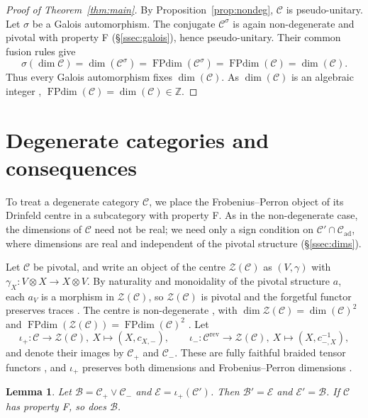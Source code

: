 \documentclass[11pt,oneside]{amsart}
\newtheorem{lemma}[theorem]{Lemma}
\theoremstyle{remark}
\newcommand{\C}{\mathcal C}
\newcommand{\B}{\mathcal B}
\newcommand{\E}{\mathcal E}
\newcommand{\Zc}{\mathcal Z}
\newcommand{\FP}{\operatorname{FPdim}}
\newcommand{\Z}{\mathbb Z}
\newcommand{\ad}{\mathrm{ad}}
\newcommand{\rev}{\mathrm{rev}}
\begin{document}
\begin{proof}[Proof of Theorem~\ref{thm:main}]
By Proposition~\ref{prop:nondeg}, $\C$ is pseudo-unitary. Let $\sigma$ be a
Galois automorphism. The conjugate $\C^\sigma$ is again non-degenerate and
pivotal with property F (\S\ref{ssec:galois}), hence pseudo-unitary. Their
common fusion rules give
\[
\sigma(\dim\C)=\dim(\C^\sigma)=\FP(\C^\sigma)=\FP(\C)=\dim(\C).
\]
Thus every Galois automorphism fixes $\dim(\C)$. As $\dim(\C)$ is an algebraic
integer \cite[Theorem~2.3, Remark~2.5]{ENO}, $\FP(\C)=\dim(\C)\in\Z$.
\end{proof}

\section{Degenerate categories and consequences}\label{sec:degenerate}

To treat a degenerate category $\C$, we place the Frobenius--Perron object of
its Drinfeld centre in a subcategory with property F. As in the
non-degenerate case, the dimensions of $\C$ need not be real; we need only a
sign condition on $\C'\cap\C_\ad$, where dimensions are real and independent
of the pivotal structure (\S\ref{ssec:dims}).

Let $\C$ be pivotal, and write an object of the centre $\Zc(\C)$ as
$(V,\gamma)$ with $\gamma_X:V\otimes X\to X\otimes V$. By naturality and
monoidality of the pivotal structure $a$, each $a_V$ is a morphism in
$\Zc(\C)$, so $\Zc(\C)$ is pivotal and the forgetful functor preserves traces
\cite[Exercise~7.13.6]{EGNO}.
The centre is non-degenerate \cite[Corollary~3.9]{DGNO}, with
$\dim\Zc(\C)=\dim(\C)^2$ \cite[Theorem~2.15]{ENO} and
$\FP(\Zc(\C))=\FP(\C)^2$ \cite[Theorem~7.16.6]{EGNO}. Let
\[
\iota_+:\C\longrightarrow\Zc(\C),\ X\longmapsto(X,c_{X,-}),\qquad
\iota_-:\C^\rev\longrightarrow\Zc(\C),\ X\longmapsto(X,c^{-1}_{-,X}),
\]
and denote their images by $\C_+$ and $\C_-$. These are fully faithful braided
tensor functors \cite[Proposition~8.6.1]{EGNO}, and $\iota_+$ preserves both
dimensions and Frobenius--Perron dimensions \cite[Proposition~4.5.7]{EGNO}.

\begin{lemma}\label{lem:centre}
Let $\B=\C_+\vee\C_-$ and $\E=\iota_+(\C')$. Then $\B'=\E$ and $\E'=\B$. If $\C$
has property F, so does $\B$.
\end{lemma}
\end{document}
